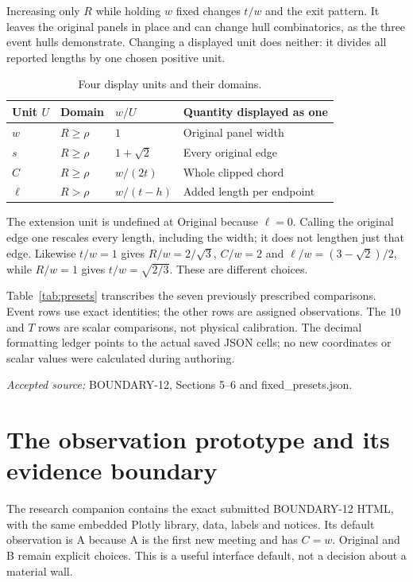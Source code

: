 \documentclass[11pt,a4paper]{article}
\newcommand{\source}[1]{\par{\small\emph{Accepted source:} #1}\par}
\begin{document}
Increasing only $R$ while holding $w$ fixed changes $t/w$ and the exit pattern. It leaves the original panels in place and can change hull combinatorics, as the three event hulls demonstrate. Changing a displayed unit does neither: it divides all reported lengths by one chosen positive unit.
\begin{table}[ht]\centering\small
\caption{Four display units and their domains.}\label{tab:units}
\begin{tabularx}{\linewidth}{@{}lllX@{}}\toprule
Unit $U$ & Domain & $w/U$ & Quantity displayed as one\\\midrule
$w$ &$R\geq\rho$&$1$&Original panel width\\
$s$ &$R\geq\rho$&$1+\sqrt2$&Every original edge\\
$C$ &$R\geq\rho$&$w/(2t)$&Whole clipped chord\\
$\ell$ &$R>\rho$&$w/(t-h)$&Added length per endpoint\\\bottomrule
\end{tabularx}
\end{table}
The extension unit is undefined at Original because $\ell=0$. Calling the original edge one rescales every length, including the width; it does not lengthen just that edge. Likewise $t/w=1$ gives $R/w=2/\sqrt3$, $C/w=2$ and $\ell/w=(3-\sqrt2)/2$, while $R/w=1$ gives $t/w=\sqrt{2/3}$. These are different choices.

Table~\ref{tab:presets} transcribes the seven previously prescribed comparisons. Event rows use exact identities; the other rows are assigned observations. The $10$ and $T$ rows are scalar comparisons, not physical calibration. The decimal formatting ledger points to the actual saved JSON cells; no new coordinates or scalar values were calculated during authoring.
\begin{table}[ht]\centering\small
\caption{Saved seven-preset displays, $w=1$. Exact radius definitions accompany the row names.}\label{tab:presets}

\end{table}
\source{BOUNDARY-12, Sections 5--6 and fixed\_presets.json.}

\section{The observation prototype and its evidence boundary}\label{sec:viewer}
The research companion contains the exact submitted BOUNDARY-12 HTML, with the same embedded Plotly library, data, labels and notices. Its default observation is A because A is the first new meeting and has $C=w$. Original and B remain explicit choices. This is a useful interface default, not a decision about a material wall.
\end{document}
